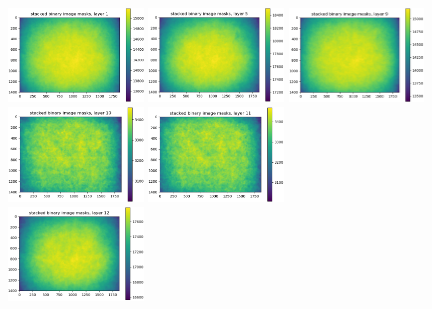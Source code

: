 \documentclass[letterpaper,11pt]{article}
\begin{document}
\begin{figure}[!ht]
\centering
\includegraphics[width=0.32\textwidth]{images/measuring_flatfield_corrections/mask_stack_layers_polaris/mask_stack_layer_1}
\includegraphics[width=0.32\textwidth]{images/measuring_flatfield_corrections/mask_stack_layers_polaris/mask_stack_layer_5}
\includegraphics[width=0.32\textwidth]{images/measuring_flatfield_corrections/mask_stack_layers_polaris/mask_stack_layer_9}
\includegraphics[width=0.32\textwidth]{images/measuring_flatfield_corrections/mask_stack_layers_polaris/mask_stack_layer_10}
\includegraphics[width=0.32\textwidth]{images/measuring_flatfield_corrections/mask_stack_layers_polaris/mask_stack_layer_11} \\
\includegraphics[width=0.32\textwidth]{images/measuring_flatfield_corrections/mask_stack_layers_polaris/mask_stack_layer_12}

\end{figure}
\end{document}
